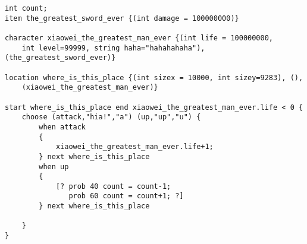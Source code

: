 \documentclass[12pt]{article}
\begin{document}
\begin{verbatim}
int count;
item the_greatest_sword_ever {(int damage = 100000000)}

character xiaowei_the_greatest_man_ever {(int life = 100000000, 
    int level=99999, string haha="hahahahaha"), (the_greatest_sword_ever)}

location where_is_this_place {(int sizex = 10000, int sizey=9283), (),
    (xiaowei_the_greatest_man_ever)}

start where_is_this_place end xiaowei_the_greatest_man_ever.life < 0 {
    choose (attack,"hia!","a") (up,"up","u") {
        when attack 
        {
            xiaowei_the_greatest_man_ever.life+1;
        } next where_is_this_place
        when up 
        {
            [? prob 40 count = count-1;
               prob 60 count = count+1; ?]
        } next where_is_this_place
		
    }
}
\end{verbatim}
\end{document}

